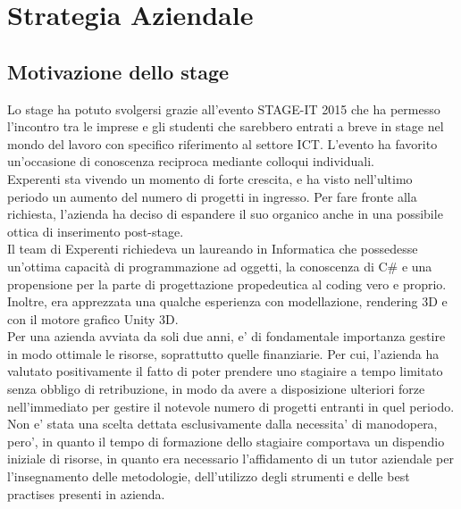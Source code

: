 \section{Strategia Aziendale}
\subsection{Motivazione dello stage}
Lo stage ha potuto svolgersi grazie all'evento STAGE-IT 2015 che ha permesso l'incontro tra le imprese e gli studenti che sarebbero entrati a breve in stage nel mondo del lavoro con specifico riferimento al settore ICT. L'evento ha favorito un'occasione di conoscenza reciproca mediante colloqui individuali.
\\
Experenti sta vivendo un momento di forte crescita, e ha visto nell'ultimo periodo un aumento del numero di progetti in ingresso. Per fare fronte alla richiesta, l'azienda ha deciso di espandere il suo organico anche in una possibile ottica di inserimento post-stage.
\\
Il team di Experenti richiedeva un laureando in Informatica che possedesse un’ottima capacità di programmazione ad oggetti, la conoscenza di C\# e una propensione per la parte di progettazione propedeutica al coding vero e proprio.
Inoltre, era apprezzata una qualche esperienza con modellazione, rendering 3D e con il motore grafico Unity 3D.
\\
Per una azienda avviata da soli due anni, e' di fondamentale importanza gestire in modo ottimale le risorse, soprattutto quelle finanziarie. Per cui, l'azienda ha valutato positivamente il fatto di poter prendere uno stagiaire a tempo limitato senza obbligo di retribuzione, in modo da avere a disposizione ulteriori forze nell'immediato per gestire il notevole numero di progetti entranti in quel periodo. 
\\
Non e' stata una scelta dettata esclusivamente dalla necessita' di manodopera, pero', in quanto il tempo di formazione dello stagiaire comportava un dispendio iniziale di risorse, in quanto era necessario l'affidamento di un tutor aziendale per l'insegnamento delle metodologie, dell'utilizzo degli strumenti e delle best practises presenti in azienda.
